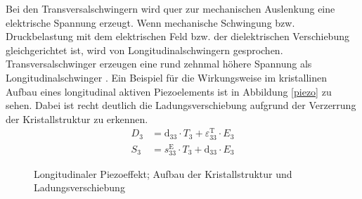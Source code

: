 \documentclass[12pt]{scrreprt} %
\begin{document}
Bei den Transversalschwingern wird quer zur mechanischen Auslenkung eine elektrische Spannung erzeugt. Wenn mechanische Schwingung bzw. Druckbelastung mit dem elektrischen Feld bzw. der dielektrischen Verschiebung gleichgerichtet ist, wird von Longitudinalschwingern gesprochen. Transversalschwinger erzeugen eine rund zehnmal höhere Spannung als Longitudinalschwinger \citep[S.39]{Dembowski2011}. Ein Beispiel für die Wirkungsweise im kristallinen Aufbau eines longitudinal aktiven Piezoelements ist in Abbildung \vref{piezo} zu sehen. Dabei ist recht deutlich die Ladungsverschiebung aufgrund der Verzerrung der Kristallstruktur zu erkennen. 
\begin{align}
D_3 & =  \textrm{d}_{33} \cdot T_3 + \varepsilon_{33}^{\textrm{T}} \cdot E_3 \label{formel:3.5} \\
S_3 & =  s_{33}^{\textrm{E}} \cdot T_3 + \textrm{d}_{33} \cdot E_3 \label{formel:3.6}
\end{align}
\begin {figure}[htbp]
      \begin{center}
      \end{center}
\caption[Longitudinaler Piezoeffekt; Kristallstruktur und Ladungsverschiebung]{Longitudinaler Piezoeffekt; Aufbau der Kristallstruktur und Ladungsverschiebung}
\label{piezo}
\end{figure}
\end{document}

